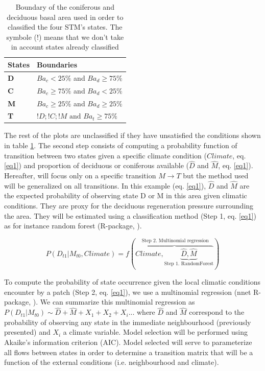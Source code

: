 \begin{table}[h]
\centering
\caption{Boundary of the coniferous and deciduous basal area used in order to classified the four STM's states. The symbole ($!$) means that we don't take in account states already classified}
\begin{tabular}{ll}
	States  & Boundaries                            \\
	\hline
	\textbf{D} & $Ba_c< 25\%$ and $Ba_d \geq 75\%$    \\
	\textbf{C} & $Ba_c \geq 75\%$ and $Ba_d < 25\%$    \\
	\textbf{M} & $Ba_c \geq 25\%$ and $Ba_d \geq 25\%$ \\
	\textbf{T} & $!D;!C;!M \text{ and }  Ba_t  \geq 75\%$                                
\end{tabular}

\label{bound}
\end{table}

The rest of the plots are unclassified if they have unsatisfied the conditions
shown in table \ref{bound}. The second step consists of computing a
probability function of transition between two states given a specific climate
condition ($Climate$, eq. \ref{eq1}) and proportion of deciduous or coniferous
available ($\hat{D}$ and $\hat{M}$, eq. \ref{eq1}).  Hereafter, will focus
only on a specific transition $M \rightarrow T$ but the method used will be
generalized on all transitions.  In this example (eq. \ref{eq1}),  $\hat{D}$
and $\hat{M}$ are the expected probability of observing state D or M in this
area given climatic conditions. They are proxy for the deciduous regeneration
pressure surrounding the area. They will be estimated using  a classification
method (Step 1, eq. \ref{eq1}) as for instance random forest (R-package,
\cite{Liaw2002a}).

\begin{equation}
	P(D_{t1}|M_{t0}, Climate) = f(\overbrace{Climate, \underbrace{\hat{D}, \hat{M}}_\text{Step 1. RandomForest}}^\text{ Step 2. Multinomial regression})
\label{eq1}
\end{equation}


To compute the probability of state occurrence given the local climatic
conditions encounter by a patch (Step 2, eq. \ref{eq1}), we use a multinomial
regression (nnet R-package, \cite{Venables2002}). We can summarize this
multinomial regression as $P(D_{t1}|M_{t0}) \sim \hat{D} + \hat{M} +
X_1+X_2+X_i... $ where $\hat{D}$ and $\hat{M}$ correspond to the probability
of observing any state in the immediate neighbourhood (previously presented)
and $X_i$ a climate variable. Model selection will be performed using Akaike's
information criterion (AIC). Model selected will serve to parameterize all
flows between states in order to determine a transition matrix that will be a
function of the external conditions (i.e. neighbourhood and climate).   \\

